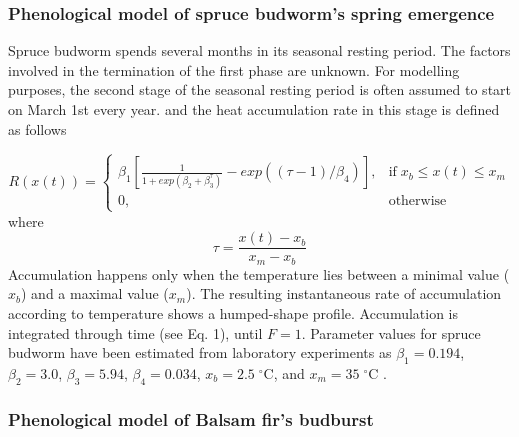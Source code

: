 \documentclass[12 pt]{article}
\begin{document}
\subsubsection{Phenological model of spruce budworm's spring emergence}

Spruce budworm spends several months in its seasonal resting period. The factors involved in the termination of the first phase are unknown. For modelling purposes, the second stage of the seasonal resting period is often assumed to start on March 1st every year. and the  heat accumulation rate in this stage is defined as follows \citep{Regniere2012} 

\begin{equation}\label{budworm}
    R(x(t)) = \left \lbrace
    \begin{array}{ll}
        \beta _1 \left[ \frac{1}{1+exp(\beta _2 + \beta _3 ^\tau)} -exp((\tau -1)/\beta _4) \right], & \text{if} \; x_b \leq x(t) \leq x_m \\
        0, & \text{otherwise}
    \end{array} \right . \tag{Eq. \theequation}
\end{equation} 
where
\begin{equation}
    \tau = \frac{x(t)-x_b}{x_m - x_b} \tag{Eq. \theequation}
\end{equation}
Accumulation happens only when the temperature lies between a minimal value ($x_b$) and a maximal value ($x_m$). The resulting instantaneous rate of accumulation according to temperature shows a humped-shape profile. Accumulation is integrated through time (see Eq. 1), until $F = 1$. Parameter values for spruce budworm have been estimated from laboratory experiments as $\beta _1=0.194$,  $\beta _2=3.0$, $\beta _3=5.94$, $\beta _4=0.034$, $x_b = 2.5 \; ^{\circ}\text{C}$, and $x_m = 35 \; ^{\circ}\text{C}$ \citep{Regniere2012}.

\subsubsection{Phenological model of Balsam fir's budburst}
\end{document}
